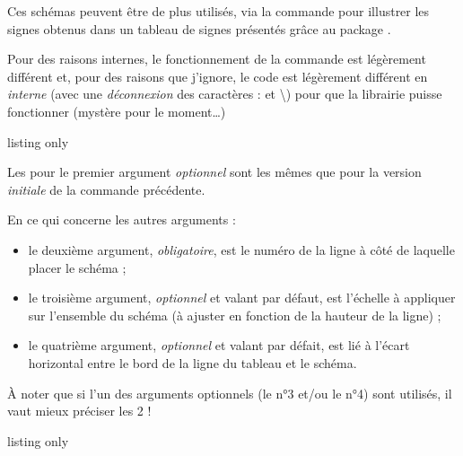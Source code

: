\begin{tipblock}
Ces schémas peuvent être de plus utilisés, via la commande  pour illustrer les signes obtenus dans un tableau de signes présentés grâce au package .

Pour des raisons internes, le fonctionnement de la commande  est légèrement différent et, pour des raisons que j'ignore, le code est légèrement différent en \textit{interne} (avec une \textit{déconnexion} des caractères \textsf{:} et \textsf{\textbackslash}) pour que la librairie \TikZ{}  puisse fonctionner (mystère pour le moment\ldots)
\end{tipblock}

\begin{PresCodeTexPL}{listing only}
\end{PresCodeTexPL}

\begin{cautionblock}
Les  pour le premier argument \textit{optionnel} sont les mêmes que pour la version \textit{initiale} de la commande précédente.

En ce qui concerne les autres arguments :

\begin{itemize}
	\item le deuxième argument, \textit{obligatoire}, est le numéro de la ligne à côté de laquelle placer le schéma ;
	\item le troisième argument, \textit{optionnel} et valant  par défaut, est l'échelle à appliquer sur l'ensemble du schéma (à ajuster en fonction de la hauteur de la ligne) ;
	\item le quatrième argument, \textit{optionnel} et valant  par défait, est lié à l'écart horizontal entre le bord de la ligne du tableau et le schéma.
\end{itemize}

À noter que si l'un des arguments optionnels (le n°3 et/ou le n°4) sont utilisés, il vaut mieux préciser les 2 !
\end{cautionblock}

\begin{PresCodeTexPL}{listing only}
\begin{center}
\end{center}
\end{PresCodeTexPL}

